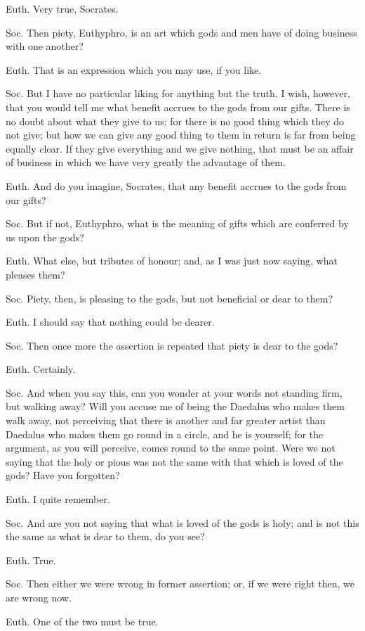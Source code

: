 Euth. Very true, Socrates.

Soc. Then piety, Euthyphro, is an art which gods and men have of doing business with one another?

Euth. That is an expression which you may use, if you like.

Soc. But I have no particular liking for anything but the truth. I wish, however, that you would tell me what benefit accrues to the gods from our gifts. There is no doubt about what they give to us; for there is no good thing which they do not give; but how we can give any good thing to them in return is far from being equally clear. If they give everything and we give nothing, that must be an affair of business in which we have very greatly the advantage of them.

Euth. And do you imagine, Socrates, that any benefit accrues to the gods from our gifts?

Soc. But if not, Euthyphro, what is the meaning of gifts which are conferred by us upon the gods?

Euth. What else, but tributes of honour; and, as I was just now saying, what pleases them?

Soc. Piety, then, is pleasing to the gods, but not beneficial or dear to them?

Euth. I should say that nothing could be dearer.

Soc. Then once more the assertion is repeated that piety is dear to the gods?

Euth. Certainly.

Soc. And when you say this, can you wonder at your words not standing firm, but walking away? Will you accuse me of being the Daedalus who makes them walk away, not perceiving that there is another and far greater artist than Daedalus who makes them go round in a circle, and he is yourself; for the argument, as you will perceive, comes round to the same point. Were we not saying that the holy or pious was not the same with that which is loved of the gods? Have you forgotten?

Euth. I quite remember.

Soc. And are you not saying that what is loved of the gods is holy; and is not this the same as what is dear to them, do you see?

Euth. True.

Soc. Then either we were wrong in former assertion; or, if we were right then, we are wrong now.

Euth. One of the two must be true.

